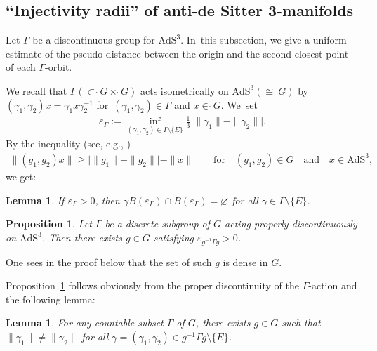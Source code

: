 \documentclass[11pt]{article}
\numberwithin{equation}{section}
\numberwithin{equation}{section}
\newtheorem{Lemma}[Theorem]{Lemma}
\newtheorem{Proposition}[Theorem]{Proposition}
\begin{document}
\setcounter{Theorem}{5}\setcounter{subsection}{3}\setcounter{equation}{9}
\subsection{``Injectivity radii'' of anti-de Sitter 3-manifolds}\label{inj-radii}
Let $\Gamma$ be a discontinuous group for $\mathrm{AdS}^{3}$. In~this subsection, we give a uniform estimate of the pseudo-distance
between the origin and the second closest point of each $\Gamma$-orbit.

We recall that $\Gamma(\subset \grave{\ }G\times\grave{\ }G)$
acts isometrically on $\mathrm{AdS}^{3}(\cong\grave{\ }G)$ by
$(\gamma_{1},\gamma_{2})x=\gamma_{1} x\gamma_{2}^{-1}$
for~$(\gamma_{1},\gamma_{2})\in\Gamma$ and $x\in\grave{\ }G$. We~set
\begin{align}
\label{varepsilon}
\varepsilon_{\Gamma} := \inf_{(\gamma_1,\gamma_2)\in
\Gamma\setminus\{E\}}
\frac{1}{3}\big|\|\gamma_1\|-\|\gamma_2\|\big|.
\end{align}
By the inequality (see, e.g., \cite[Lemma~5.5]{Kan19})
\begin{gather*}
\|(g_1,g_2)x\|\geq \big | \|g_1\|-\|g_2\| \big | - \|x\|\qquad
\text{for}\quad (g_1,g_2) \in G \quad\text{and}\quad x \in \mathrm{AdS}^{3},
\end{gather*}
we get:
\begin{Lemma}\label{inj-rad}
If $\varepsilon_{\Gamma}>0$, then
$\gamma B(\varepsilon_{\Gamma}) \cap B(\varepsilon_{\Gamma})
= \varnothing$
for all $\gamma\in \Gamma\setminus\{E\}$.
\end{Lemma}

\begin{Proposition}\label{strong}
Let $\Gamma$ be a discrete subgroup of $G$ acting properly discontinuously
on $\mathrm{AdS}^{3}$.
Then there exists $g \in G$
satisfying $\varepsilon_{g^{-1}\Gamma g} > 0$.
\end{Proposition}
\begin{Remark}
One sees in the proof below that
the set of such $g$ is dense in $G$.
\end{Remark}
Proposition~\ref{strong} follows obviously
from the proper discontinuity of the $\Gamma$-action and the following lemma:
\begin{Lemma}\label{weak}
For any countable subset $\Gamma$ of
$G$,
there exists
$g\in G$
such that $\|\gamma_1\|\neq\|\gamma_2\|$
for all $\gamma=(\gamma_1,\gamma_2)\in
g^{-1}\Gamma g \setminus \{E\}$.
\end{Lemma}
\end{document}
